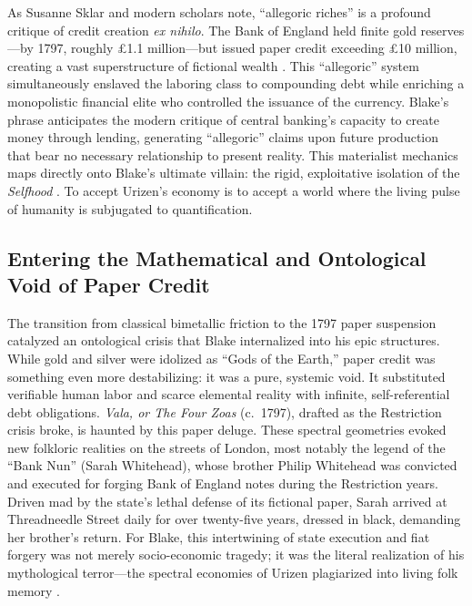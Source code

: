 \documentclass[
]{article}
\begin{document}
As Susanne Sklar and modern scholars note, ``allegoric riches'' is a
profound critique of credit creation \emph{ex nihilo}. The Bank of
England held finite gold reserves---by 1797, roughly £1.1 million---but
issued paper credit exceeding £10 million, creating a vast
superstructure of fictional wealth \citep{clapham1944bank}. This
``allegoric'' system simultaneously enslaved the laboring class to
compounding debt while enriching a monopolistic financial elite who
controlled the issuance of the currency. Blake's phrase anticipates the
modern critique of central banking's capacity to create money through
lending, generating ``allegoric'' claims upon future production that
bear no necessary relationship to present reality. This materialist
mechanics maps directly onto Blake's ultimate villain: the rigid,
exploitative isolation of the \emph{Selfhood}
\citep{schouten2021lucretius}. To accept Urizen's economy is to accept a
world where the living pulse of humanity is subjugated to
quantification.

\subsection{Entering the Mathematical and Ontological Void of Paper
Credit}\label{entering-the-mathematical-and-ontological-void-of-paper-credit}

The transition from classical bimetallic friction to the 1797 paper
suspension catalyzed an ontological crisis that Blake internalized into
his epic structures. While gold and silver were idolized as ``Gods of
the Earth,'' paper credit was something even more destabilizing: it was
a pure, systemic void. It substituted verifiable human labor and scarce
elemental reality with infinite, self-referential debt obligations.
\emph{Vala, or The Four Zoas} (c.~1797), drafted as the Restriction
crisis broke, is haunted by this paper deluge. These spectral geometries
evoked new folkloric realities on the streets of London, most notably
the legend of the ``Bank Nun'' (Sarah Whitehead), whose brother Philip
Whitehead was convicted and executed for forging Bank of England notes
during the Restriction years. Driven mad by the state's lethal defense
of its fictional paper, Sarah arrived at Threadneedle Street daily for
over twenty-five years, dressed in black, demanding her brother's
return. For Blake, this intertwining of state execution and fiat forgery
was not merely socio-economic tragedy; it was the literal realization of
his mythological terror---the spectral economies of Urizen plagiarized
into living folk memory \citep{makdisi2003william}.
\end{document}
